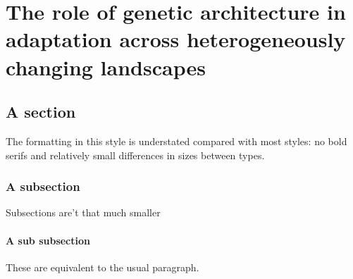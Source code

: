 \chapter{The role of genetic architecture in adaptation across heterogeneously changing landscapes}
\label{chap:heterogeneouslandscapes}

\section{A section}

The formatting in this style is understated compared with most styles:
no bold serifs and relatively small differences in sizes between types.

\subsection{A subsection}

Subsections are't that much smaller

\subsubsection{A sub subsection}

These are equivalent to the usual paragraph.

